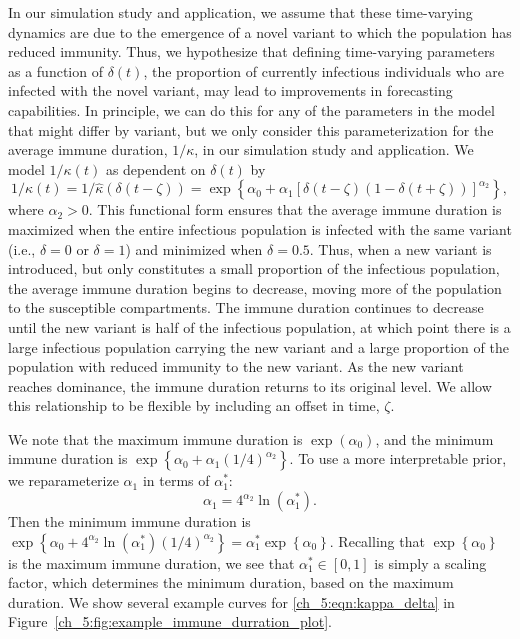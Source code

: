 In our simulation study and application, we assume that these time-varying dynamics are due to the emergence of a novel variant to which the population has reduced immunity.
Thus, we hypothesize that defining time-varying parameters as a function of \( \delta(t) \), the proportion of currently infectious individuals who are infected with the novel variant, may lead to improvements in forecasting capabilities.
In principle, we can do this for any of the parameters in the model that might differ by variant, but we only consider this parameterization for the average immune duration, \( 1 / \kappa \), in our simulation study and application.
We model \( 1 / \kappa(t) \) as dependent on \( \delta(t) \) by
\begin{equation}
    1 / \kappa(t) = 1 / \hat{\kappa}\left( \delta (t - \zeta) \right) = \exp \left\{ \alpha_0 + \alpha_1 \left[ \delta(t - \zeta) \left( 1 - \delta(t + \zeta) \right) \right]^{\alpha_2} \right\},
    \label{ch_5:eqn:kappa_delta}
\end{equation}
where \( \alpha_2 > 0 \).
This functional form ensures that the average immune duration is maximized when the entire infectious population is infected with the same variant (i.e., \( \delta = 0 \) or \( \delta = 1 \)) and minimized when \( \delta = 0.5 \).
Thus, when a new variant is introduced, but only constitutes a small proportion of the infectious population, the average immune duration begins to decrease, moving more of the population to the susceptible compartments.
The immune duration continues to decrease until the new variant is half of the infectious population, at which point there is a large infectious population carrying the new variant and a large proportion of the population with reduced immunity to the new variant.
As the new variant reaches dominance, the immune duration returns to its original level.
We allow this relationship to be flexible by including an offset in time, \( \zeta \).

We note that the maximum immune duration is \( \exp \left( \alpha_0 \right)\), and the minimum immune duration is \(\exp \left\{ \alpha_0 + \alpha_1 \left( 1/4  \right)^{\alpha_2} \right\} \).
To use a more interpretable prior, we reparameterize \( \alpha_1 \) in terms of \( \alpha_1^* \):
\begin{equation}
    \alpha_1 = 4^{\alpha_2} \ln \left( \alpha_1^* \right).
    \label{ch_5:eqn:alpha_1}
\end{equation}
Then the minimum immune duration is 
\( \exp \left\{ \alpha_0 + 4^{\alpha_2} \ln \left( \alpha_1^* \right) \left( 1/4  \right)^{\alpha_2} \right\} = \alpha_1^* \exp \left\{ \alpha_0 \right\} \).
Recalling that \( \exp \left\{ \alpha_0 \right\} \) is the maximum immune duration, we see that  \( \alpha_1^* \in [0,1] \) is simply a scaling factor, which determines the minimum duration, based on the maximum duration.
We show several example curves for \eqref{ch_5:eqn:kappa_delta} in Figure~\ref{ch_5:fig:example_immune_durration_plot}.

